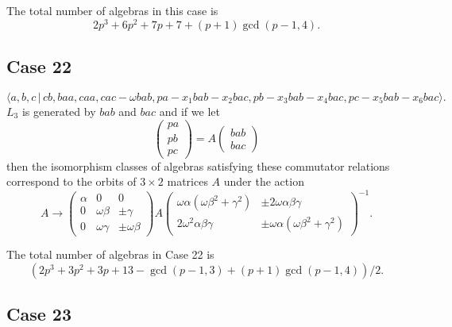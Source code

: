 \documentclass[10pt,thmsa]{article}
\begin{document}
The total number of algebras in this case is 
\[
2p^{3}+6p^{2}+7p+7+(p+1)\gcd (p-1,4). 
\]

\subsection{Case 22}

\[
\langle a,b,c\,|\,cb,baa,caa,cac-\omega
bab,pa-x_{1}bab-x_{2}bac,pb-x_{3}bab-x_{4}bac,pc-x_{5}bab-x_{6}bac\rangle . 
\]%
$L_{3}$ is generated by $bab$ and $bac$ and if we let 
\[
\left( 
\begin{array}{l}
pa \\ 
pb \\ 
pc%
\end{array}%
\right) =A\left( 
\begin{array}{l}
bab \\ 
bac%
\end{array}%
\right) 
\]%
then the isomorphism classes of algebras satisfying these commutator
relations correspond to the orbits of $3\times 2$ matrices $A$ under the
action 
\[
A\rightarrow \left( 
\begin{array}{lll}
\alpha & 0 & 0 \\ 
0 & \omega \beta & \pm \gamma \\ 
0 & \omega \gamma & \pm \omega \beta%
\end{array}%
\right) A\left( 
\begin{array}{ll}
\omega \alpha (\omega \beta ^{2}+\gamma ^{2}) & \pm 2\omega \alpha \beta
\gamma \\ 
2\omega ^{2}\alpha \beta \gamma & \pm \omega \alpha (\omega \beta
^{2}+\gamma ^{2})%
\end{array}%
\right) ^{-1}. 
\]

The total number of algebras in Case 22 is 
\[
(2p^{3}+3p^{2}+3p+13-\gcd (p-1,3)+(p+1)\gcd (p-1,4))/2. 
\]

\subsection{Case 23}
\end{document}

